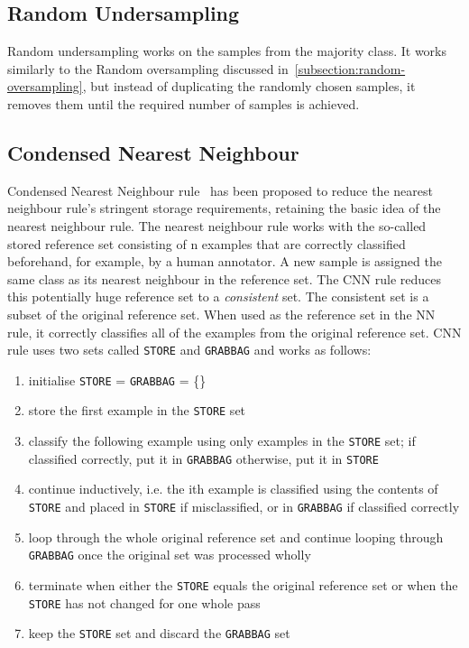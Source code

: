 \subsection{Random Undersampling}
\label{subsection:random-undersampling}

Random undersampling works on the samples from the majority class. It works similarly to the Random
oversampling discussed in~\ref{subsection:random-oversampling}, but instead of duplicating the
randomly chosen samples, it removes them until the required number of samples is achieved.


\subsection{Condensed Nearest Neighbour}
\label{subsection:cnn}

Condensed Nearest Neighbour rule~\cite{cnn} has been proposed to reduce the nearest neighbour
rule's stringent storage requirements, retaining the basic idea of the nearest neighbour rule. The
nearest neighbour rule works with the so-called stored reference set consisting of n examples that
are correctly classified beforehand, for example, by a human annotator. A new sample is assigned
the same class as its nearest neighbour in the reference set. The CNN rule reduces this potentially
huge reference set to a \emph{consistent} set. The consistent set is a subset of the original
reference set. When used as the reference set in the NN rule, it correctly classifies all of the
examples from the original reference set. CNN rule uses two sets called \texttt{STORE} and
\texttt{GRABBAG} and works as follows:

\begin{enumerate}
    \item initialise \texttt{STORE} = \texttt{GRABBAG} = \{\}
    \item store the first example in the \texttt{STORE} set
    \item classify the following example using only examples in the \texttt{STORE} set; if
        classified correctly, put it in \texttt{\texttt{GRABBAG}} otherwise, put it in
        \texttt{STORE}
    \item continue inductively, i.e. the ith example is classified using the contents of
        \texttt{STORE} and placed in \texttt{STORE} if misclassified, or in \texttt{GRABBAG} if
        classified correctly
    \item loop through the whole original reference set and continue looping through
        \texttt{GRABBAG} once the original set was processed wholly
    \item terminate when either the \texttt{STORE} equals the original reference set or when the
        \texttt{STORE} has not changed for one whole pass
    \item keep the \texttt{STORE} set and discard the \texttt{GRABBAG} set
\end{enumerate}

